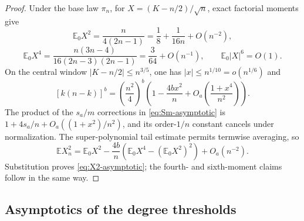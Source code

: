 \documentclass[11pt,a4paper]{amsart}
\numberwithin{equation}{section}
\theoremstyle{plain}
\theoremstyle{definition}
\newcommand{\E}{\mathbb E}
\begin{document}
\begin{proof}
Under the base law \(\pi_n\), for \(X=(K-n/2)/\sqrt n\), exact factorial
moments give
\begin{equation}\label{eq:hypergeom-moments}
 \E_0X^2=\frac{n}{4(2n-1)}
 =\frac18+\frac1{16n}+O(n^{-2}),
\end{equation}
\[
 \E_0X^4
 =\frac{n(3n-4)}{16(2n-3)(2n-1)}
 =\frac3{64}+O(n^{-1}),
 \qquad
 \E_0|X|^6=O(1).
\]
On the central window \(|K-n/2|\le n^{3/5}\), one has
\(|x|\le n^{1/10}=o(n^{1/6})\) and
\[
 [k(n-k)]^b
 =\left(\frac{n^2}{4}\right)^b
 \left(1-\frac{4bx^2}{n}
 +O_a\left(\frac{1+x^4}{n^2}\right)\right).
\]
The product of the \(s_a/m\) corrections in \eqref{eq:Sm-asymptotic} is
\(1+4s_a/n+O_a((1+x^2)/n^2)\), and its order-\(1/n\) constant cancels under
normalization.  The super-polynomial tail estimate permits termwise averaging,
so
\[
 \E X_n^2
 =\E_0X^2-\frac{4b}{n}
 \left(\E_0X^4-(\E_0X^2)^2\right)+O_a(n^{-2}).
\]
Substitution proves \eqref{eq:X2-asymptotic}; the fourth- and sixth-moment
claims follow in the same way.
\end{proof}

\subsection{Asymptotics of the degree thresholds}\label{subsec:asymptotics-degree-thresholds}
\end{document}
